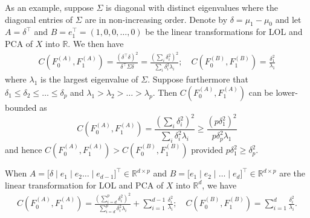 \documentclass[10pt]{article}
\begin{document}
As an example, suppose $\Sigma$ is diagonal with distinct eigenvalues where the diagonal entries of $\Sigma$ are in non-increasing order.
Denote by $\delta = \mu_1 - \mu_0$ and let
$A = \delta^{\top}$ and $B = e_1^{\top} = (1,0,0,\dots,0)$ be the linear transformations for LOL and PCA of $X$ into $\mathbb{R}$. We then have
\begin{gather*}
C(F_0^{(A)}, F_1^{(A)}) = \frac{(\delta^{\top} \delta)^2}{\delta^{\top} \Sigma \delta} = \frac{(\sum_{i} \delta_i^{2})^{2}}{\sum_{i} \delta_i^{2} \lambda_i}; \quad
C(F_0^{(B)}, F_1^{(B)}) = \frac{\delta_1^2}{\lambda_1}
\end{gather*}
where $\lambda_1$ is the largest eigenvalue of $\Sigma$. Suppose furthermore that $\delta_1 \leq \delta_2 \leq \dots \leq \delta_p$ and $\lambda_1 > \lambda_2 > \dots > \lambda_p$. Then $C(F_0^{(A)}, F_1^{(A)})$ can be lower-bounded as
$$ C(F_0^{(A)}, F_1^{(A)}) = \frac{(\sum_{i} \delta_i^{2})^{2}}{\sum_{i} \delta_i^{2} \lambda_i} \geq \frac{(p \delta_1^2)^2}{p \delta_p^{2} \lambda_1} $$
and hence $C(F_0^{(A)}, F_1^{(A)}) > C(F_0^{(B)}, F_1^{(B)})$ provided $p \delta_1^{2}  \geq \delta_p^2$.

When $A = \bigl[ \delta \mid e_1 \mid e_2 \dots \mid e_{d-1} \bigr]^{\top} \in \mathbb{R}^{d \times p}$ and $B = \bigl[e_1 \mid e_2 \mid \dots \mid e_d \bigr]^{\top} \in \mathbb{R}^{d \times p}$ are the linear transformation for LOL and PCA of $X$ into $\mathbb{R}^{d}$, we have
\begin{gather*}
C(F_0^{(A)}, F_1^{(A)}) = \frac{(\sum_{i=d}^{p} \delta_i^2)^2}{\sum_{i=d}^{p} \delta_i^2 \lambda_i} + \sum_{i=1}^{d-1} \frac{\delta_i^{2}}{\lambda_i};  \quad
C(F_0^{(B)}, F_1^{(B)}) = \sum_{i=1}^{d} \frac{\delta_i^2}{\lambda_i}.
\end{gather*}
\end{document}
